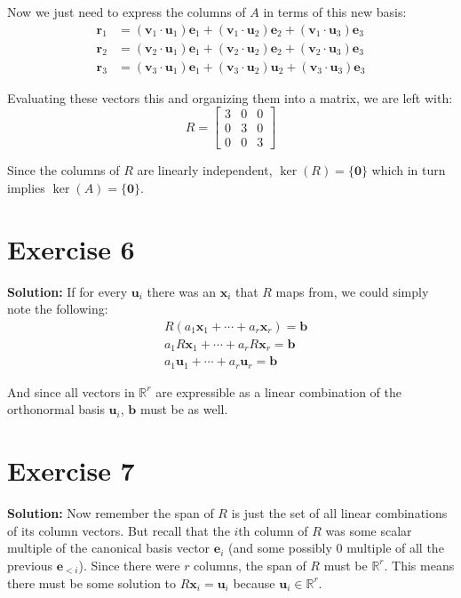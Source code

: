 \documentclass{article}
\newcommand{\R}{\mathbb R}
\newcommand{\mbf}[1]{\mathbf #1}
\begin{document}
Now we just need to express the columns of $A$ in terms of this new basis:
\begin{align*}
  \mbf r_1&=(\mbf v_1\cdot \mbf u_1)\mbf e_1+(\mbf v_1\cdot \mbf u_2)\mbf e_2+(\mbf v_1\cdot \mbf u_3)\mbf e_3\\
  \mbf r_2&=(\mbf v_2\cdot \mbf u_1)\mbf e_1+(\mbf v_2\cdot \mbf u_2)\mbf e_2+(\mbf v_2\cdot \mbf u_3)\mbf e_3\\
  \mbf r_3&=(\mbf v_3\cdot \mbf u_1)\mbf e_1+(\mbf v_3\cdot \mbf u_2)\mbf u_2+(\mbf v_3\cdot \mbf u_3)\mbf e_3
\end{align*}

Evaluating these vectors this and organizing them into a matrix, we are left with:
$$R=\begin{bmatrix}
    3 & 0 & 0\\
    0 & 3 & 0\\
    0 & 0 & 3
\end{bmatrix}$$

Since the columns of $R$ are linearly independent, $\operatorname{ker}(R)=\{\mbf 0\}$ which in turn implies $\operatorname{ker}(A)=\{\mbf 0\}$.

\section*{Exercise 6}
\textbf{Solution:} If for every $\mbf u_i$ there was an $\mbf x_i$ that $R$ maps from, we could simply note the following:
\begin{align*}
  &R(a_1\mbf x_1+\cdots+a_r\mbf x_r)=\mbf b\\
  &a_1R\mbf x_1+\cdots+a_rR\mbf x_r=\mbf b\tag{Linearity of $R$}\\
  &a_1\mbf u_1+\cdots+a_r\mbf u_r=\mbf b\tag{def. of $\mbf x_i$}
\end{align*}

And since all vectors in $\R^r$ are expressible as a linear combination of the orthonormal basis $\mbf u_i$, $\mbf b$ must be as well.

\section*{Exercise 7}
\textbf{Solution:} Now remember the span of $R$ is just the set of all linear combinations of its column vectors. But recall that the $i$th column of $R$ was some scalar multiple of the canonical basis vector $\mbf e_i$ (and some possibly 0 multiple of all the previous $\mbf e_{<i}$). Since there were $r$ columns, the span of $R$ must be $\R^r$. This means there must be some solution to $R\mbf x_i=\mbf u_i$ because $\mbf u_i\in\R^r$.
\end{document}
